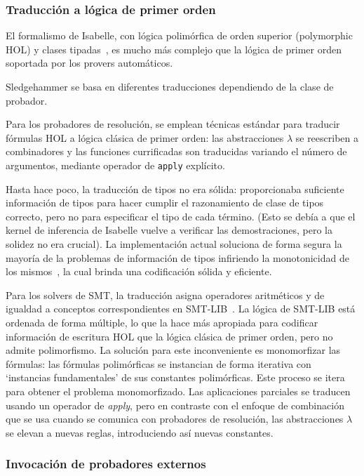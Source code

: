\documentclass[12pt]{book}
\begin{document}
\subsubsection{Traducción a lógica de primer orden}

El formalismo de Isabelle, con lógica polimórfica de orden superior (polymorphic HOL) y clases tipadas~\cite{proof_processing_Isabelle}, es mucho más complejo que la lógica de primer orden soportada por los provers automáticos.

Sledgehammer se basa en diferentes traducciones dependiendo de la clase de probador.

Para los probadores de resolución, se emplean técnicas estándar para traducir fórmulas HOL a lógica clásica de primer orden: las abstracciones $\lambda$ se reescriben a combinadores y las funciones currificadas son traducidas variando el número de argumentos, mediante operador de \texttt{apply} explícito.

Hasta hace poco, la traducción de tipos no era sólida: proporcionaba suficiente información de tipos para hacer cumplir el razonamiento de clase de tipos correcto, pero no para especificar el tipo de cada término. (Esto se debía a que el kernel de inferencia de Isabelle vuelve a verificar las demostraciones, pero la solidez no era crucial). La implementación actual soluciona de forma segura la mayoría de la problemas de información de tipos infiriendo la monotonicidad de los mismos~\cite{monotonicity_inference_for_hol}, la cual brinda una codificación sólida y eficiente.

Para los solvers de SMT, la traducción asigna operadores aritméticos y de igualdad a conceptos correspondientes en SMT-LIB~\cite{SMT-LIB}. La lógica de SMT-LIB está ordenada de forma múltiple, lo que la hace más apropiada para codificar información de escritura HOL que la lógica clásica de primer orden, pero no admite polimorfismo. La solución para este inconveniente es monomorfizar las fórmulas: las fórmulas polimórficas se instancian de forma iterativa con `instancias fundamentales' de sus constantes polimórficas. Este proceso se itera para obtener el problema monomorfizado. Las aplicaciones parciales se traducen usando un operador de \textit{apply}, pero en contraste con el enfoque de combinación que se usa cuando se comunica con probadores de resolución, las abstracciones $\lambda$ se elevan a nuevas reglas, introduciendo así nuevas constantes.

\subsubsection{Invocación de probadores externos}
\end{document}
